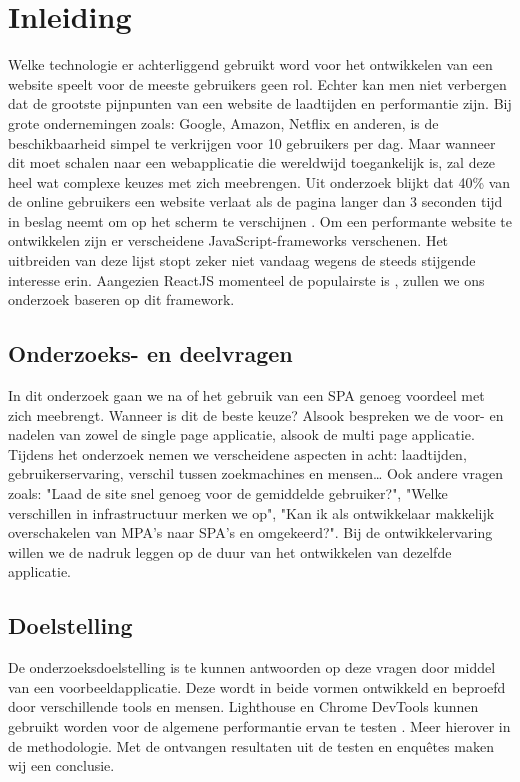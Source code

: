 \documentclass{hogent-article}
\affiliation{
  \textsuperscript{1} \href{mailto:jens.penneman@student.hogent.be}{jens.penneman@student.hogent.be}}
\begin{document}
\flushbottom
\maketitle
\tableofcontents
\thispagestyle{empty}


\section{Inleiding}
Welke technologie er achterliggend gebruikt word voor het ontwikkelen van een website speelt voor de meeste gebruikers geen rol.
Echter kan men niet verbergen dat de grootste pijnpunten van een website de laadtijden en performantie zijn.
Bij grote ondernemingen zoals: Google, Amazon, Netflix en anderen, is de beschikbaarheid simpel te verkrijgen voor 10 gebruikers per dag.
Maar wanneer dit moet schalen naar een webapplicatie die wereldwijd toegankelijk is, zal deze heel wat complexe keuzes met zich meebrengen.
Uit onderzoek blijkt dat 40\% van de online gebruikers een website verlaat als de pagina langer dan 3 seconden tijd in beslag neemt om op het scherm te verschijnen \autocite{LoadingSpeedWedevs2021}.
Om een performante website te ontwikkelen zijn er verscheidene JavaScript-frameworks verschenen. Het uitbreiden van deze lijst stopt zeker niet vandaag wegens de steeds stijgende interesse erin.
Aangezien ReactJS momenteel de populairste is \autocite{Gathoni2022}, zullen we ons onderzoek baseren op dit framework. 

\subsection{Onderzoeks- en deelvragen}
In dit onderzoek gaan we na of het gebruik van een SPA genoeg voordeel met zich meebrengt.
Wanneer is dit de beste keuze?
Alsook bespreken we de voor- en nadelen van zowel de single page applicatie, alsook de multi page applicatie.
Tijdens het onderzoek nemen we verscheidene aspecten in acht:
laadtijden,
gebruikerservaring,
verschil tussen zoekmachines en mensen\dots
Ook andere vragen zoals:
"Laad de site snel genoeg voor de gemiddelde gebruiker?",
"Welke verschillen in infrastructuur merken we op",
"Kan ik als ontwikkelaar makkelijk overschakelen van MPA's naar SPA's en omgekeerd?".
Bij de ontwikkelervaring willen we de nadruk leggen op de duur van het ontwikkelen van dezelfde applicatie.

\subsection{Doelstelling}
De onderzoeksdoelstelling is te kunnen antwoorden op deze vragen door middel van een voorbeeldapplicatie.
Deze wordt in beide vormen ontwikkeld en beproefd door verschillende tools en mensen.
Lighthouse en Chrome DevTools kunnen gebruikt worden voor de algemene performantie ervan te testen \autocite{Demian2022}.
Meer hierover in de methodologie.
Met de ontvangen resultaten uit de testen en enquêtes maken wij een conclusie.
\end{document}
